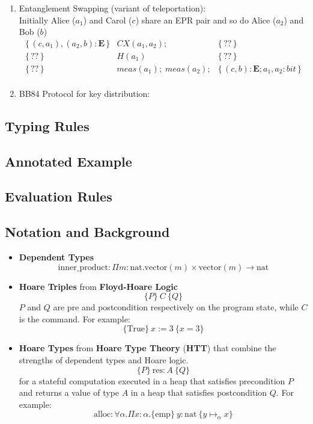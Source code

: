 \documentclass[acmsmall,nonacm,review,timestamp]{acmart}
\newcommand{\E}{\ensuremath{\mathbf{E}}\xspace}
\newcommand\hoare[3]{\{\,#1\,\}&#2&\{\,#3\,\}}
\begin{document}
\begin{enumerate}
\newpage
	\item Entanglement Swapping (variant of teleportation):\\
	Initially Alice ($a_1$) and Carol ($c$) share an EPR pair and so do Alice ($a_2$) and Bob ($b$)
\[ \begin{array}{rcl}
\hoare{(c, a_1), (a_2, b): \E}{CX(a_1, a_2);}{??} \\
\hoare{??}{H(a_1)}{??}\\
\hoare{??}{meas(a_1); \; meas(a_2);}{(c,b): \E; a_1, a_2 : bit}\\
\end{array} \]

\item BB84 Protocol for key distribution:
\end{enumerate}


\subsection{Typing Rules}

\subsection{Annotated Example}

\subsection{Evaluation Rules}

\subsection{Notation and Background}
\begin{itemize}
	\item \textbf{Dependent Types}
	\[ \mathrm{inner\_product}: \Pi m: \mathrm{nat}.\mathrm{vector}(m) \times \mathrm{vector}(m) \rightarrow \mathrm{nat} \]

	\item \textbf{Hoare Triples} from \textbf{Floyd-Hoare Logic}
	\[ \{P\}\ C\ \{Q\} \]
	$P$ and $Q$ are pre and postcondition respectively on the program state, while $C$ is the command. For example:
	\[ \{\mathrm{True}\}\ x := 3\ \{x=3\} \]
	\item \textbf{Hoare Types} from \textbf{Hoare Type Theory} (\textbf{HTT}) that combine the strengths of dependent types and Hoare logic.
	\[ \{P\}\ \mathrm{res}:A\ \{Q\}\]
	for a stateful computation executed in a heap that satisfies precondition $P$ and returns a value of type $A$ in a heap that satisfies postcondition $Q$. For example:
	\[ \mathrm{alloc} : \forall \alpha . \Pi x : \alpha. \{\mathrm{emp}\}\ y : \mathrm{nat}\ \{ y \mapsto_{\alpha} x\}\]
\end{itemize}
\end{document}
